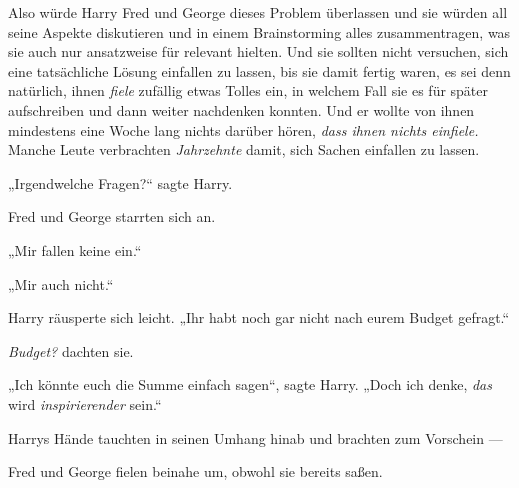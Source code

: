 Also würde Harry Fred und George dieses Problem überlassen und sie würden all seine Aspekte diskutieren und in einem Brainstorming alles zusammentragen, was sie auch nur ansatzweise für relevant hielten. Und sie sollten nicht versuchen, sich eine tatsächliche Lösung einfallen zu lassen, bis sie damit fertig waren, es sei denn natürlich, ihnen \emph{fiele} zufällig etwas Tolles ein, in welchem Fall sie es für später aufschreiben und dann weiter nachdenken konnten. Und er wollte von ihnen mindestens eine Woche lang nichts darüber hören, \emph{dass ihnen nichts einfiele.} Manche Leute verbrachten \emph{Jahrzehnte} damit, sich Sachen einfallen zu lassen.

„Irgendwelche Fragen?“ sagte Harry.

Fred und George starrten sich an.

„Mir fallen keine ein.“

„Mir auch nicht.“

Harry räusperte sich leicht.
„Ihr habt noch gar nicht nach eurem Budget gefragt.“

\emph{Budget?} dachten sie.

„Ich könnte euch die Summe einfach sagen“, sagte Harry.
„Doch ich denke, \emph{das} wird \emph{inspirierender} sein.“

Harrys Hände tauchten in seinen Umhang hinab und brachten zum Vorschein —

Fred und George fielen beinahe um, obwohl sie bereits saßen.

